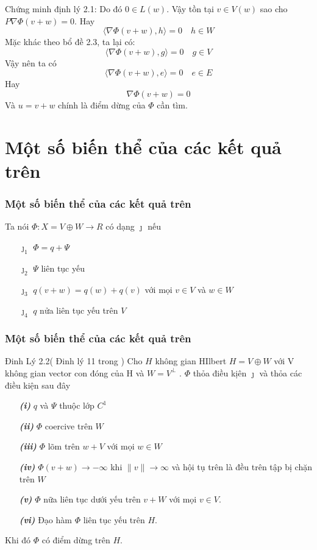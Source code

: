 \documentclass[11pt]{beamer}
\numberwithin{equation}{section}
\theoremstyle{plain}
\theoremstyle{definition}
\theoremstyle{remark}
\begin{document}
\begin{frame}
\begin{block}{Chứng minh định lý 2.1:}
Do đó $0\in L(w)$. Vậy tồn tại $v \in V(w)$ sao cho $P \nabla \Phi(v+w)=0$. Hay
\[\langle \nabla \Phi (v+w) ,h \rangle =0 \quad h \in W\]
Mặc khác theo bổ đề 2.3, ta lại có:
\[\langle \nabla \Phi (v+w) ,g \rangle =0 \quad g \in V\]
Vậy nên ta có
\[\langle \nabla \Phi (v+w) ,e \rangle =0 \quad e \in E\]
Hay \[\nabla \Phi (v+w)=0\]
Và $u=v+w$ chính là điểm dừng của $\Phi$ cần tìm.
\end{block}

\end{frame}

\section{Một số biến thể của các kết quả trên}

\begin{frame}
\frametitle{Một số biến thể của các kết quả trên}
\noindent Ta nói $\Phi : X =V \oplus W \rightarrow R$ có dạng $ \jmath$ nếu
\begin{itemize}
\item[$\jmath_1$ ] $\Phi =q +\Psi$
\item[$\jmath_2$ ] $\Psi$ liên tục yếu
\item[$\jmath_3$ ] $q(v+w)=q(w)+q(v)$ với mọi $v \in V$ và $w \in W$ 
\item[$\jmath_4$ ]   $q$ nửa liên tục yếu trên $V$
\end{itemize}
\end{frame}



\begin{frame}
\frametitle{Một số biến thể của các kết quả trên}
\begin{block}{Đinh Lý 2.2( Đinh lý 11 trong \cite{YJMM})}
Cho $H$ không gian HIlbert $H=V \oplus W$ với V không gian vector con đóng của H và $W = V^{\perp}$ . $\Phi$ thỏa điều kịên $ \jmath$  và thỏa các điều kiện sau đây
\begin{itemize}
\item[\textbf{\textit{(i)}}]  $q$ và $\Psi$ thuộc lớp $C^1$
\item[\textbf{\textit{(ii)}}]  $\Phi$ coercive trên $W$
\item[\textbf{\textit{(iii)}}]  $\Phi$ lõm trên $w+V$ với mọi $w \in W$
\item[\textbf{\textit{(iv)}}]  $\Phi(v+w) \rightarrow -\infty$ khi $\|v\| \rightarrow \infty $ và hội tụ trên là đều trên tập bị chặn trên $W$
\item[\textbf{\textit{(v)}}] $\Phi$ nữa liên tục dưới yếu trên $v+W$ với mọi $v \in V$.
\item[\textbf{\textit{(vi)}}]  Đạo hàm $\Phi$ liên tục yếu trên $H$.
\end{itemize}
Khi đó  $\Phi$ có điểm  dừng trên $H$.
\end{block}
\end{frame}
\end{document}
